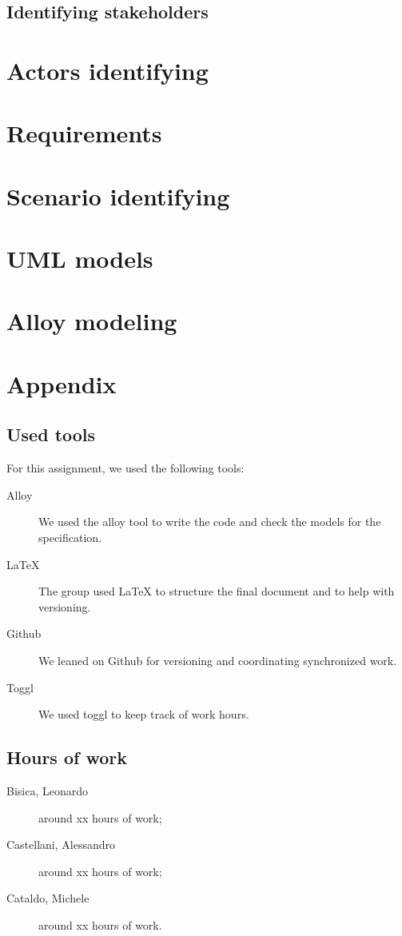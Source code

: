 \documentclass[12pt, a4paper]{article}
\begin{document}
		\subsection{Identifying stakeholders}


	\newpage
	\section{Actors identifying}
	\newpage
	\section{Requirements}

	\newpage
	\section{Scenario identifying}
		

	\newpage
	\section{UML models}

	\newpage
	\section{Alloy modeling}

	\newpage
	\section{Appendix}
		\listoffigures
		\listoftables
		
		\subsection{Used tools}
		For this assignment, we used the following tools:
		
		\begin{description}
			\item [Alloy] We used the alloy tool to write the code and check the models for the specification.
			\item [LaTeX] The group used LaTeX to structure the final document and to help with versioning.
			\item [Github] We leaned on Github for versioning and coordinating synchronized work.
			\item [Toggl] We used toggl to keep track of work hours.
			
		\end{description}
		
		\subsection{Hours of work}
			\begin{description}
				\item[Bisica, Leonardo] around xx hours of work;
				\item[Castellani, Alessandro] around xx hours of work;
				\item[Cataldo, Michele] around xx hours of work.
			\end{description}
			
\end{document}
